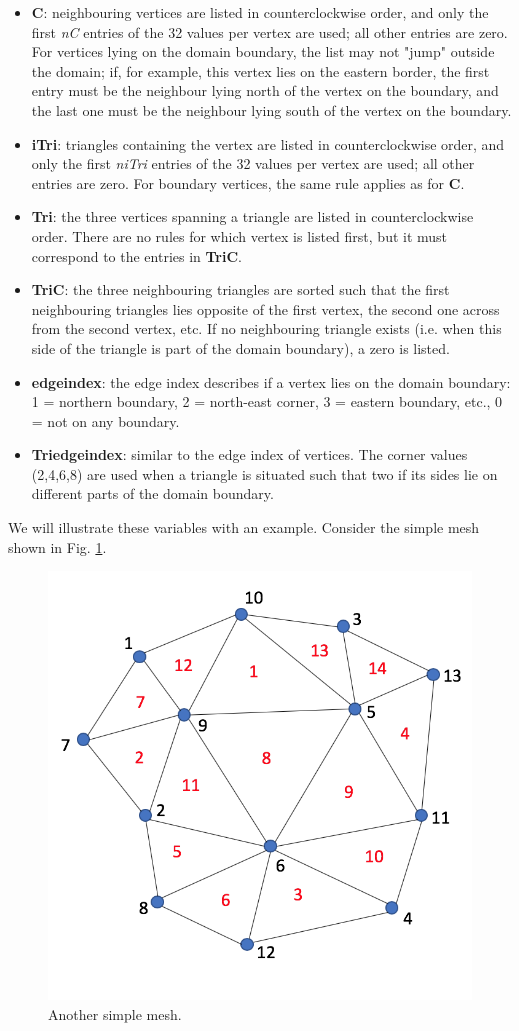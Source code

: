 \documentclass{article}
\begin{document}
\begin{itemize}
  \item \textbf{C}: neighbouring vertices are listed in counterclockwise order, and only the first \textit{nC}
   entries of the 32 values per vertex are used; all other entries are zero. For vertices lying on the domain boundary, the list may not "jump" outside the domain; if, for example, this vertex lies on the eastern border, the first entry must be the neighbour lying north of the vertex on the boundary, and the last one must be the neighbour lying south of the vertex on the boundary.
  \item \textbf{iTri}: triangles containing the vertex are listed in counterclockwise order, and only the first \textit{niTri}
   entries of the 32 values per vertex are used; all other entries are zero. For boundary vertices, the same rule applies as for \textbf{C}.
  \item \textbf{Tri}: the three vertices spanning a triangle are listed in counterclockwise order. There are no rules for which vertex is listed first, but it must correspond to the entries in \textbf{TriC}.
  \item \textbf{TriC}: the three neighbouring triangles are sorted such that the first neighbouring triangles lies opposite of the first vertex, the second one across from the second vertex, etc. If no neighbouring triangle exists (i.e. when this side of the triangle is part of the domain boundary), a zero is listed.
  \item \textbf{edge\textunderscore index}: the edge index describes if a vertex lies on the domain boundary: 1 = northern boundary, 2 = north-east corner, 3 = eastern boundary, etc., 0 = not on any boundary.
  \item \textbf{Tri\textunderscore edge\textunderscore index}: similar to the edge index of vertices. The corner values (2,4,6,8) are used when a triangle is
   situated such that two if its sides lie on different parts of the domain boundary.
\end{itemize}

We will illustrate these variables with an example. Consider the simple mesh shown in Fig. \ref{fig:meshdata_02}.

\begin{figure}[H] \label{fig:meshdata_02}
  \includegraphics[width=0.5\linewidth]{Fig_meshdata_02.png}
  \caption{Another simple mesh.}
\end{figure}
\end{document}
